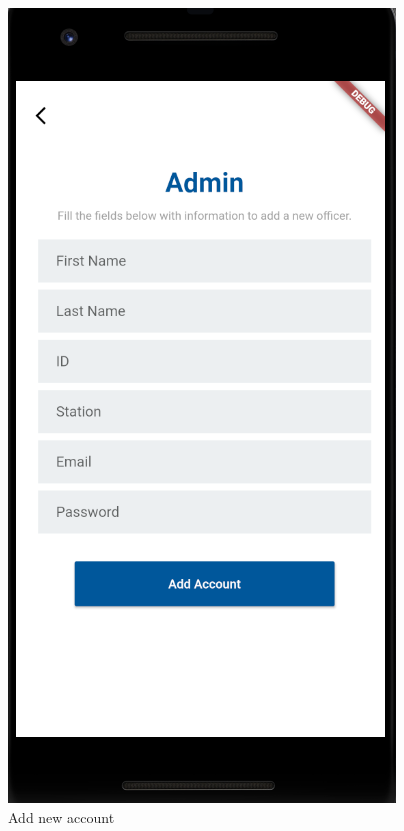 \documentclass[12pt]{article}
\begin{document}
\begin{figure}[h]
\begin{minipage}[b]{0.32\textwidth}
      \end{minipage}
  \begin{minipage}[b]{0.32\textwidth}
    \includegraphics[width=\textwidth]{AddAccount.PNG}
    \caption{Add new account}
  \end{minipage}
\end{figure}
\clearpage
\end{document}
